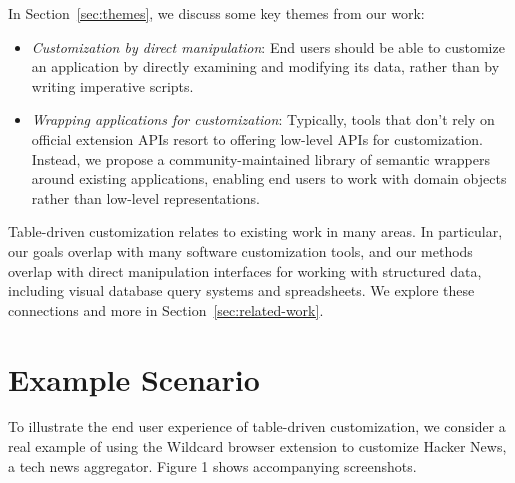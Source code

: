 \documentclass[sigplan,screen,10pt,anonymous,review]{acmart}
\providecommand{\tightlist}{%
  \setlength{\itemsep}{0pt}\setlength{\parskip}{0pt}}
\begin{document}
In Section~\ref{sec:themes}, we discuss some key themes from our work:

\begin{itemize}
\tightlist
\item
  \emph{Customization by direct manipulation}: End users should be able
  to customize an application by directly examining and modifying its
  data, rather than by writing imperative scripts.
\item
  \emph{Wrapping applications for customization}: Typically, tools that
  don't rely on official extension APIs resort to offering low-level
  APIs for customization. Instead, we propose a community-maintained
  library of semantic wrappers around existing applications, enabling
  end users to work with domain objects rather than low-level
  representations.
\end{itemize}

Table-driven customization relates to existing work in many areas. In
particular, our goals overlap with many software customization tools,
and our methods overlap with direct manipulation interfaces for working
with structured data, including visual database query systems and
spreadsheets. We explore these connections and more in
Section~\ref{sec:related-work}.

\hypertarget{sec:example}{%
\section{Example Scenario}\label{sec:example}}

To illustrate the end user experience of table-driven customization, we
consider a real example of using the Wildcard browser extension to
customize Hacker News, a tech news aggregator. Figure 1 shows
accompanying screenshots.
\end{document}
